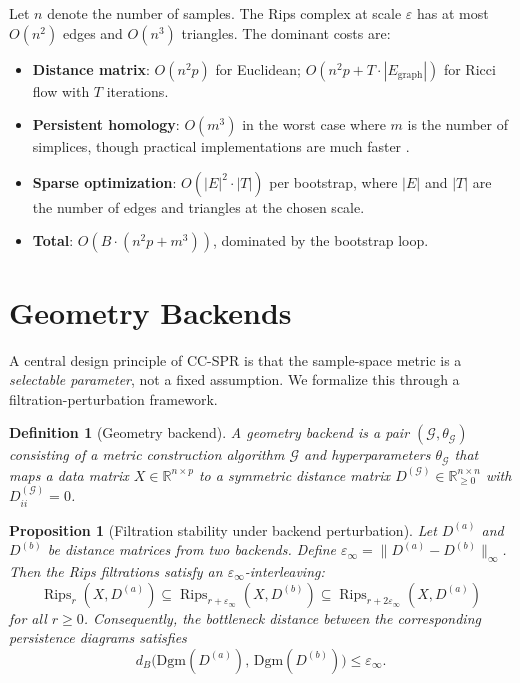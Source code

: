 \documentclass[11pt]{article}
\newtheorem{proposition}[theorem]{Proposition}
\newtheorem{definition}[theorem]{Definition}
\DeclareMathOperator{\Rips}{Rips}
\begin{document}
Let $n$ denote the number of samples.
The Rips complex at scale $\varepsilon$ has at most $O(n^2)$ edges and $O(n^3)$ triangles.
The dominant costs are:
\begin{itemize}[leftmargin=1.5em]
\item \textbf{Distance matrix}: $O(n^2 p)$ for Euclidean; $O(n^2 p + T \cdot |E_{\text{graph}}|)$ for Ricci flow with $T$ iterations.
\item \textbf{Persistent homology}: $O(m^3)$ in the worst case where $m$ is the number of simplices, though practical implementations are much faster \cite{gudhi2014}.
\item \textbf{Sparse optimization}: $O(|E|^2 \cdot |T|)$ per bootstrap, where $|E|$ and $|T|$ are the number of edges and triangles at the chosen scale.
\item \textbf{Total}: $O(B \cdot (n^2 p + m^3))$, dominated by the bootstrap loop.
\end{itemize}

\section{Geometry Backends}
\label{sec:backends}

A central design principle of CC-SPR is that the sample-space metric is a \emph{selectable parameter}, not a fixed assumption.
We formalize this through a filtration-perturbation framework.

\begin{definition}[Geometry backend]\label{def:backend}
A \emph{geometry backend} is a pair $(\mathcal{G}, \theta_{\mathcal{G}})$ consisting of a metric construction algorithm $\mathcal{G}$ and hyperparameters $\theta_{\mathcal{G}}$ that maps a data matrix $X \in \mathbb{R}^{n \times p}$ to a symmetric distance matrix $D^{(\mathcal{G})} \in \mathbb{R}_{\ge 0}^{n \times n}$ with $D^{(\mathcal{G})}_{ii} = 0$.
\end{definition}

\begin{proposition}[Filtration stability under backend perturbation]\label{prop:stability}
Let $D^{(a)}$ and $D^{(b)}$ be distance matrices from two backends.
Define $\varepsilon_\infty = \|D^{(a)} - D^{(b)}\|_\infty$.
Then the Rips filtrations satisfy an $\varepsilon_\infty$-interleaving:
\[
\Rips_r(X, D^{(a)}) \subseteq \Rips_{r + \varepsilon_\infty}(X, D^{(b)}) \subseteq \Rips_{r + 2\varepsilon_\infty}(X, D^{(a)})
\]
for all $r \ge 0$.
Consequently, the bottleneck distance between the corresponding persistence diagrams satisfies
\[
d_B\bigl(\mathrm{Dgm}(D^{(a)}),\, \mathrm{Dgm}(D^{(b)})\bigr) \le \varepsilon_\infty.
\]
\end{proposition}
\end{document}
